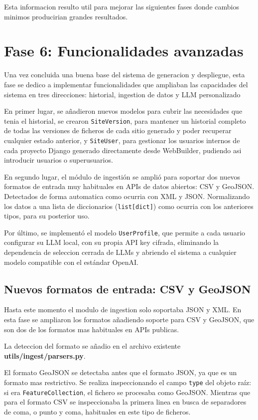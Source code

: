 Esta informacion resulto util para mejorar las siguientes fases donde cambios minimos producirian grandes resultados.


\section{Fase 6: Funcionalidades avanzadas}
\label{sec:funcionalidades-avanzadas}

Una vez concluida una buena base del sistema de generacion y despliegue, esta fase se dedico a implementar funcionalidades que ampliaban las capacidades del sistema en tres direcciones: historial, ingestion de datos y LLM personalizado

En primer lugar, se añadieron nuevos modelos para cubrir las necesidades que tenia el historial, se crearon \texttt{SiteVersion}, para mantener 
un historial completo de todas las versiones de ficheros de cada sitio generado y poder recuperar cualquier estado anterior, y \texttt{SiteUser}, 
para gestionar los usuarios internos de cada proyecto Django generado directamente desde WebBuilder, pudiendo asi introducir usuarios o superusuarios.

En segundo lugar, el módulo de ingestión se amplió para soportar dos nuevos formatos de entrada muy habituales en APIs de datos abiertos: CSV y GeoJSON. Detectados de forma automatica como ocurria con XML y JSON. Normalizando los datos a una lista de diccionarios (\texttt{list[dict]}) como ocurria con los anteriores tipos, para su posterior uso.


Por último, se implementó el modelo \texttt{UserProfile}, que permite a cada usuario configurar su LLM local, con su propia API key cifrada, eliminando la dependencia de seleccion cerrada de LLMs y abriendo el sistema a cualquier modelo compatible con el estándar OpenAI.

\subsection{Nuevos formatos de entrada: CSV y GeoJSON}
\label{subsec:nuevos-formatos-entrada}

Hasta este momento el modulo de ingestion solo soportaba JSON y XML. En esta fase se ampliaron los formatos añadiendo soporte para CSV y GeoJSON, que son dos de los formatos mas habituales en APIs publicas.

La deteccion del formato se añadio en el archivo existente \textbf{utils/ingest/parsers.py}. 

El formato GeoJSON se detectaba antes que el formato JSON, ya que es un formato mas restrictivo. Se realiza inspeccionando el campo \texttt{type} del objeto raíz: si era \texttt{FeatureCollection}, el fichero se procesaba como GeoJSON. Mientras que para el formato CSV se inspeccionaba la primera linea en busca de separadores de coma, o punto y coma, habituales en este tipo de ficheros.

